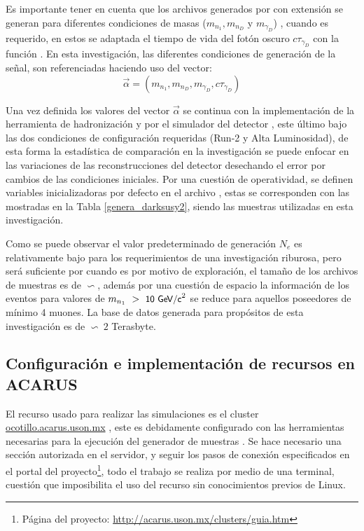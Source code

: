 Es importante tener en cuenta que los archivos generados por  con extensión  se generan para diferentes condiciones de masas ($m_{n_1}, m_{n_D}$ y  $m_{\gamma_D}$)%
, cuando  es requerido, en estos se adaptada el tiempo de vida del fotón oscuro $c\tau_{\gamma_D}$ %
con la función . En esta investigación, las diferentes condiciones de generación de la señal, son referenciadas haciendo uso del vector:
\begin{equation}
\vec{\alpha} = (m_{n_1}, m_{n_D}, m_{\gamma_D}, c\tau_{\gamma_D})
\end{equation}

Una vez definida los valores del vector $\vec{\alpha}$ se continua con la implementación de la herramienta de hadronización  y por el simulador del detector , este último bajo las dos condiciones de configuración requeridas (Run-2 y Alta Luminosidad), de esta forma la estadística de comparación en la investigación se puede enfocar en las variaciones de las reconstrucciones del detector desechando el error por cambios de las condiciones iniciales. %
Por una cuestión de operatividad, se definen variables inicializadoras por defecto en el archivo , estas se corresponden con las mostradas en la Tabla \ref{genera_darksusy2}, siendo las muestras utilizadas en esta investigación.

Como se puede observar el valor predeterminado de generación $N_e$ es relativamente bajo para los requerimientos de una investigación riburosa, pero será suficiente por cuando es por motivo de exploración, el tamaño de los archivos de muestras es de $\backsim$, además por una cuestión de espacio la información de los eventos para valores de $m_{n_1}~>~\textsf{\small 10 GeV/c}^2$ %
se reduce para aquellos poseedores de mínimo 4 muones. La base de datos generada para propósitos de esta investigación es de $\backsim ~2$ Terasbyte.

\subsection{Configuración e implementación de recursos en ACARUS}

El recurso usado para realizar las simulaciones es el cluster \href{ocotillo.acarus.uson.mx}{ocotillo.acarus.uson.mx}%
, este es debidamente configurado con las herramientas necesarias para la ejecución del generador de muestras . Se hace necesario una sección autorizada en el servidor, y seguir los pasos de conexión especificados en el portal del proyecto\footnote{ Página del proyecto: \href{http://acarus.uson.mx/clusters/guia.htm}{http://acarus.uson.mx/clusters/guia.htm}}, todo el trabajo se realiza por medio de una terminal, cuestión que imposibilita el uso del recurso sin conocimientos previos de Linux.

